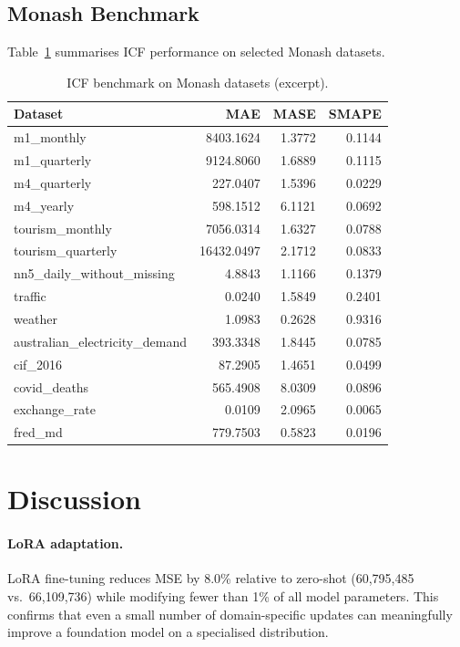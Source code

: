 \documentclass[11pt,a4paper]{article}
\begin{document}
\subsection{Monash Benchmark}

Table~\ref{tab:monash} summarises ICF performance on selected Monash datasets.

\begin{table}[htbp]
\centering
\small
\begin{tabular}{lrrr}\toprule
Dataset & MAE & MASE & SMAPE \\\midrule
m1\_monthly & 8403.1624 & 1.3772 & 0.1144 \\
m1\_quarterly & 9124.8060 & 1.6889 & 0.1115 \\
m4\_quarterly & 227.0407 & 1.5396 & 0.0229 \\
m4\_yearly & 598.1512 & 6.1121 & 0.0692 \\
tourism\_monthly & 7056.0314 & 1.6327 & 0.0788 \\
tourism\_quarterly & 16432.0497 & 2.1712 & 0.0833 \\
nn5\_daily\_without\_missing & 4.8843 & 1.1166 & 0.1379 \\
traffic & 0.0240 & 1.5849 & 0.2401 \\
weather & 1.0983 & 0.2628 & 0.9316 \\
australian\_electricity\_demand & 393.3348 & 1.8445 & 0.0785 \\
cif\_2016 & 87.2905 & 1.4651 & 0.0499 \\
covid\_deaths & 565.4908 & 8.0309 & 0.0896 \\
exchange\_rate & 0.0109 & 2.0965 & 0.0065 \\
fred\_md & 779.7503 & 0.5823 & 0.0196 \\
\bottomrule
\end{tabular}
\caption{ICF benchmark on Monash datasets (excerpt).}
\label{tab:monash}
\end{table}

\section{Discussion}

\paragraph{LoRA adaptation.}
LoRA fine-tuning reduces MSE by 8.0\% relative to zero-shot (60,795,485 vs.\ 66,109,736) while modifying fewer than 1\% of all model parameters. This confirms that even a small number of domain-specific updates can meaningfully improve a foundation model on a specialised distribution.
\end{document}
